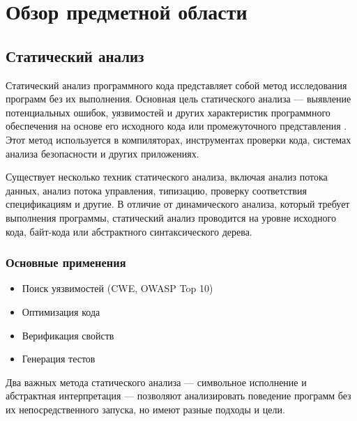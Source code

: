 \section{Обзор предметной области}

\subsection{Статический анализ}

Статический анализ программного кода представляет собой метод исследования программ без их выполнения. Основная цель статического анализа — выявление потенциальных ошибок, уязвимостей и других характеристик программного обеспечения на основе его исходного кода или промежуточного представления \cite{CousotCousot77}. Этот метод используется в компиляторах, инструментах проверки кода, системах анализа безопасности и других приложениях.

Существует несколько техник статического анализа, включая анализ потока данных, анализ потока управления, типизацию, проверку соответствия спецификациям и другие. В отличие от динамического анализа, который требует выполнения программы, статический анализ проводится на уровне исходного кода, байт-кода или абстрактного синтаксического дерева.

\begin{center}
\end{center}

\subsubsection*{Основные применения}
\begin{itemize}
    \item Поиск уязвимостей (CWE, OWASP Top 10)
    \item Оптимизация кода
    \item Верификация свойств
    \item Генерация тестов
\end{itemize}

Два важных метода статического анализа — символьное исполнение и абстрактная интерпретация — позволяют анализировать поведение программ без их непосредственного запуска, но имеют разные подходы и цели.




